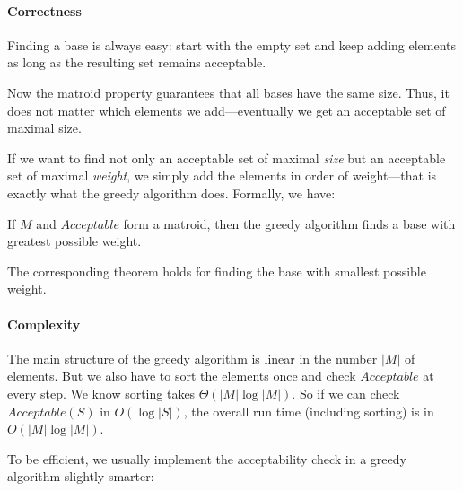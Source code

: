\paragraph{Correctness}
Finding a base is always easy: start with the empty set and keep adding elements as long as the resulting set remains acceptable.

Now the matroid property guarantees that all bases have the same size.
Thus, it does not matter which elements we add---eventually we get an acceptable set of maximal size.

If we want to find not only an acceptable set of maximal \emph{size} but an acceptable set of maximal \emph{weight}, we simply add the elements in order of weight---that is exactly what the greedy algorithm does.
Formally, we have:

\begin{theorem}
If $M$ and $Acceptable$ form a matroid, then the greedy algorithm finds a base with greatest possible weight.
\end{theorem}

The corresponding theorem holds for finding the base with smallest possible weight.

\paragraph{Complexity}
The main structure of the greedy algorithm is linear in the number $|M|$ of elements.
But we also have to sort the elements once and check $Acceptable$ at every step.
We know sorting takes $\Theta(|M|\log |M|)$.
So if we can check $Acceptable(S)$ in $O(\log|S|)$, the overall run time (including sorting) is in $O(|M|\log|M|)$.

To be efficient, we usually implement the acceptability check in a greedy algorithm slightly smarter:
\begin{acode}
\\
\\
\\
\end{acode}

